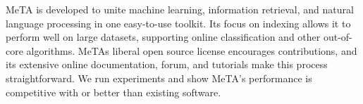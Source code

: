 MeTA is developed to unite machine learning, information retrieval, and natural language processing in one easy-to-use toolkit. Its focus on indexing allows it to perform well on large datasets, supporting online classification and other out-of-core algorithms. MeTAs liberal open source license encourages contributions, and its extensive online documentation, forum, and tutorials make this process straightforward. We run experiments and show MeTA's performance is competitive with or better than existing software.
